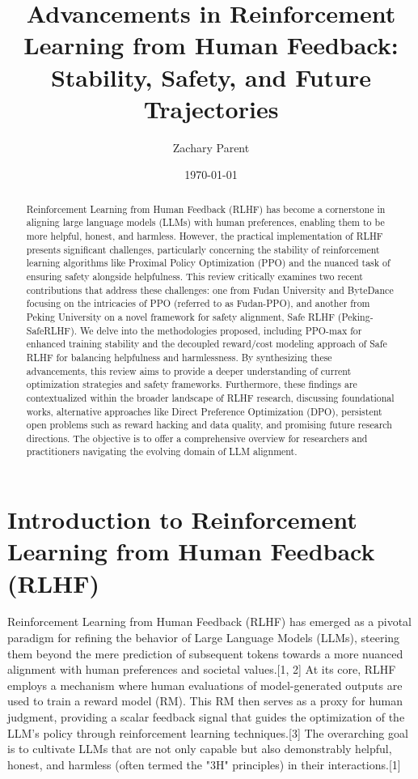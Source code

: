 \documentclass[10pt,journal,compsoc]{IEEEtran} %
\title{Advancements in Reinforcement Learning from Human Feedback: Stability, Safety, and Future Trajectories}
\author{Zachary Parent}
\date{\today}
\begin{document}
\maketitle

\begin{abstract}
Reinforcement Learning from Human Feedback (RLHF) has become a cornerstone in aligning large language models (LLMs) with human preferences, enabling them to be more helpful, honest, and harmless. However, the practical implementation of RLHF presents significant challenges, particularly concerning the stability of reinforcement learning algorithms like Proximal Policy Optimization (PPO) and the nuanced task of ensuring safety alongside helpfulness. This review critically examines two recent contributions that address these challenges: one from Fudan University and ByteDance focusing on the intricacies of PPO (referred to as Fudan-PPO), and another from Peking University on a novel framework for safety alignment, Safe RLHF (Peking-SafeRLHF). We delve into the methodologies proposed, including PPO-max for enhanced training stability and the decoupled reward/cost modeling approach of Safe RLHF for balancing helpfulness and harmlessness. By synthesizing these advancements, this review aims to provide a deeper understanding of current optimization strategies and safety frameworks. Furthermore, these findings are contextualized within the broader landscape of RLHF research, discussing foundational works, alternative approaches like Direct Preference Optimization (DPO), persistent open problems such as reward hacking and data quality, and promising future research directions. The objective is to offer a comprehensive overview for researchers and practitioners navigating the evolving domain of LLM alignment.
\end{abstract}

\section{Introduction to Reinforcement Learning from Human Feedback (RLHF)}
\label{sec:introduction}

Reinforcement Learning from Human Feedback (RLHF) has emerged as a pivotal paradigm for refining the behavior of Large Language Models (LLMs), steering them beyond the mere prediction of subsequent tokens towards a more nuanced alignment with human preferences and societal values.[1, 2] At its core, RLHF employs a mechanism where human evaluations of model-generated outputs are used to train a reward model (RM). This RM then serves as a proxy for human judgment, providing a scalar feedback signal that guides the optimization of the LLM's policy through reinforcement learning techniques.[3] The overarching goal is to cultivate LLMs that are not only capable but also demonstrably helpful, honest, and harmless (often termed the "3H" principles) in their interactions.[1]
\end{document}
